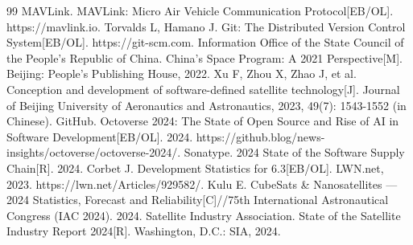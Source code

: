 \documentclass[11pt]{article}
\begin{document}
\begin{thebibliography}{99}
 MAVLink. MAVLink: Micro Air Vehicle Communication Protocol[EB/OL]. https://mavlink.io.
 Torvalds L, Hamano J. Git: The Distributed Version Control System[EB/OL]. https://git-scm.com.
 Information Office of the State Council of the People's Republic of China. China's Space Program: A 2021 Perspective[M]. Beijing: People's Publishing House, 2022.
 Xu F, Zhou X, Zhao J, et al. Conception and development of software-defined satellite technology[J]. Journal of Beijing University of Aeronautics and Astronautics, 2023, 49(7): 1543-1552 (in Chinese).
 GitHub. Octoverse 2024: The State of Open Source and Rise of AI in Software Development[EB/OL]. 2024. https://github.blog/news-insights/octoverse/octoverse-2024/.
 Sonatype. 2024 State of the Software Supply Chain[R]. 2024.
 Corbet J. Development Statistics for 6.3[EB/OL]. LWN.net, 2023. https://lwn.net/Articles/929582/.
 Kulu E. CubeSats \& Nanosatellites --- 2024 Statistics, Forecast and Reliability[C]//75th International Astronautical Congress (IAC 2024). 2024.
 Satellite Industry Association. State of the Satellite Industry Report 2024[R]. Washington, D.C.: SIA, 2024.
\end{thebibliography}
\end{document}
